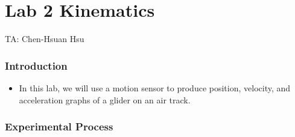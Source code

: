 \documentclass{article}
\begin{document}
\part*{Lab 2 Kinematics}
TA: Chen-Hsuan Hsu\\
\vspace{-0.3in}
\section*{Introduction}
\begin{itemize}
\item In this lab, we will use a motion sensor to produce position, velocity, and acceleration graphs of a glider on an air track.  

\end{itemize}

\vspace{-0.3in}

\section*{Experimental Process}
\end{document}

